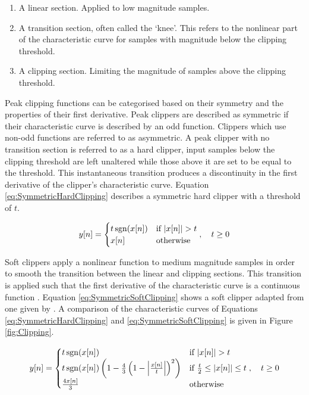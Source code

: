 		\begin{enumerate}
			\item A linear section. Applied to low magnitude samples.
			\item A transition section, often called the `knee'. This refers to the nonlinear part of the
				characteristic curve for samples with magnitude below the clipping threshold.
			\item A clipping section. Limiting the magnitude of samples above the clipping threshold.
		\end{enumerate}
		
		Peak clipping functions can be categorised based on their symmetry and the properties of their first
		derivative. Peak clippers are described as symmetric if their characteristic curve is described by an odd
		function. Clippers which use non-odd functions are referred to as asymmetric. A peak clipper with no
		transition section is referred to as a hard clipper, input samples below the clipping threshold are left
		unaltered while those above it are set to be equal to the threshold. This instantaneous transition produces
		a discontinuity in the first derivative of the clipper's characteristic curve. Equation
		\ref{eq:SymmetricHardClipping} describes a symmetric hard clipper with a threshold of $t$.

		\begin{equation}
			y[n] = \begin{cases}
				t\operatorname{sgn}(x[n]) & \text{if $\left|x[n]\right| > t$} \\
				x[n] & \text{otherwise}
			\end{cases}, \quad t \geq 0
			\label{eq:SymmetricHardClipping}
		\end{equation}
		
		Soft clippers apply a nonlinear function to medium magnitude samples in order to smooth the transition
		between the linear and clipping sections. This transition is applied such that the first derivative of the
		characteristic curve is a continuous function \citep{esqueda2015aliasing}. Equation
		\ref{eq:SymmetricSoftClipping} shows a soft clipper adapted from one given by
		\citet{dutilleux2011nonlinear}. A comparison of the characteristic curves of Equations
		\ref{eq:SymmetricHardClipping} and \ref{eq:SymmetricSoftClipping} is given in Figure \ref{fig:Clipping}.

		\begin{equation}
			y[n] = \begin{cases}
				t\operatorname{sgn}(x[n]) & \text{if $\left|x[n]\right| > t$} \\
				t\operatorname{sgn}(x[n]) \left( 1 - \frac{4}{3} \left( 1 - \left|\frac{x[n]}{t}\right| \right)^{2}
				           \right) & \text{if $\frac{t}{2} \leq \left|x[n]\right| \leq t$} \\
				\frac{4x[n]}{3} & \text{otherwise}
			\end{cases}, \quad t \geq 0
			\label{eq:SymmetricSoftClipping}
		\end{equation}

